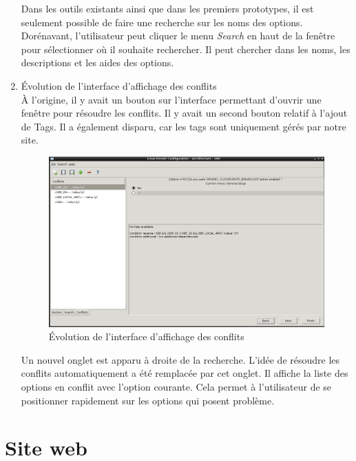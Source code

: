 \documentclass[17pts]{report}
\begin{document}
\begin{enumerate}
    Dans les outils existants ainsi que dans les premiers prototypes, il est
    seulement possible de faire une recherche sur les noms des options.
    Dorénavant, l'utilisateur peut cliquer le menu \textit{Search} en haut de la
    fenêtre pour sélectionner où il souhaite rechercher. Il peut chercher dans
    les noms, les descriptions et les aides des options.

    \pagebreak

    \item Évolution de l'interface d'affichage des conflits \\

    À l'origine, il y avait un bouton sur l'interface permettant d'ouvrir une
    fenêtre pour résoudre les conflits. Il y avait un second bouton relatif à
    l'ajout de Tags. Il a également disparu, car les tags sont uniquement gérés
    par notre site.

    \begin{figure}[H]
        \includegraphics[scale=0.5]{./illustrations/screen_options_conflits_interface.png}
        \centering
        \caption{Évolution de l'interface d'affichage des conflits}
        \label{fig:Evo_affichage_conflits}
    \end{figure}

    Un nouvel onglet est apparu à droite de la recherche. L'idée de résoudre
    les conflits automatiquement a été remplacée par cet onglet. Il affiche la
    liste des options en conflit avec l'option courante. Cela permet à
    l'utilisateur de se positionner rapidement sur les options qui posent
    problème.
\end{enumerate}

\newpage
\section{Site web}
\label{sec:Site web}
\end{document}
